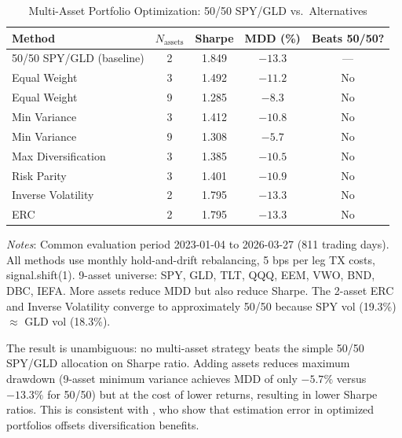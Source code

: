 \documentclass[12pt,a4paper]{article}
\begin{document}
\begin{table}[H]
\centering
\small
\begin{threeparttable}
\caption{Multi-Asset Portfolio Optimization: 50/50 SPY/GLD vs.\ Alternatives}
\label{tab:multiasset}
\begin{tabular}{@{}lcccc@{}}
\toprule
Method & $N_{\text{assets}}$ & Sharpe & MDD (\%) & Beats 50/50? \\
\midrule
50/50 SPY/GLD (baseline) & 2 & 1.849 & $-13.3$ & --- \\
\midrule
Equal Weight & 3 & 1.492 & $-11.2$ & No \\
Equal Weight & 9 & 1.285 & $-8.3$ & No \\
Min Variance & 3 & 1.412 & $-10.8$ & No \\
Min Variance & 9 & 1.308 & $-5.7$ & No \\
Max Diversification & 3 & 1.385 & $-10.5$ & No \\
Risk Parity & 3 & 1.401 & $-10.9$ & No \\
Inverse Volatility & 2 & 1.795 & $-13.3$ & No \\
ERC & 2 & 1.795 & $-13.3$ & No \\
\bottomrule
\end{tabular}
\begin{tablenotes}
\small
\item \textit{Notes}: Common evaluation period 2023-01-04 to 2026-03-27 (811 trading days). All methods use monthly hold-and-drift rebalancing, 5 bps per leg TX costs, signal.shift(1). 9-asset universe: SPY, GLD, TLT, QQQ, EEM, VWO, BND, DBC, IEFA. More assets reduce MDD but also reduce Sharpe. The 2-asset ERC and Inverse Volatility converge to approximately 50/50 because SPY vol (19.3\%) $\approx$ GLD vol (18.3\%).
\end{tablenotes}
\end{threeparttable}
\end{table}

The result is unambiguous: no multi-asset strategy beats the simple 50/50 SPY/GLD allocation on Sharpe ratio. Adding assets reduces maximum drawdown (9-asset minimum variance achieves MDD of only $-5.7\%$ versus $-13.3\%$ for 50/50) but at the cost of lower returns, resulting in lower Sharpe ratios. This is consistent with \citet{demiguel2009}, who show that estimation error in optimized portfolios offsets diversification benefits.
\end{document}
